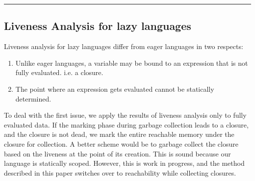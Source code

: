 \documentclass{sig-alternate}
\begin{document}

\bigskip
\hrule 
\bigskip

\subsection{Liveness Analysis for lazy languages}


Liveness analysis for lazy languages differ from eager languages in
two respects:
\begin{enumerate}
\item Unlike eager languages, a variable may be  bound to an
  expression that is not fully evaluated. i.e. a closure.
\item The point where an expression gets evaluated cannot be statically
  determined.
\end{enumerate}

To  deal  with the  first  issue, we  apply  the  results of  liveness
analysis only  to fully evaluated  data.  If the marking  phase during
garbage collection leads to a closure, and the closure is not dead, we
mark the entire reachable memory  under the closure for collection.  A
better scheme  would be  to garbage collect  the closure based  on the
liveness  at the point  of its  creation.  This  is sound  because our
language is statically scoped.  However, this is work in progress, and
the method described in this paper switches over to reachability while
collecting closures.
\end{document}
